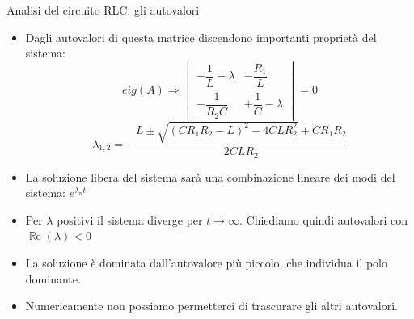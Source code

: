 \documentclass[aspectratio=169, 10pt, handout,usenames,dvipsnames]{beamer}
\begin{document}
\begin{frame}{Analisi del circuito RLC: gli autovalori}
    \begin{itemize}
        \item Dagli autovalori di questa matrice discendono importanti proprietà del sistema:
        \medskip
        \[
        eig(A) \Rightarrow  \begin{vmatrix} -\dfrac{1}{L}-\lambda & - \dfrac{R_1}{L}\\[1.5ex] -\dfrac{1}{R_2 C} & + \dfrac{1}{C}-\lambda \end{vmatrix} = 0
        \]
        \medskip
        \[
        \lambda_{1,2}  = -\frac{L \pm \sqrt{(C R_1 R_2 - L)^2 - 4CL R_2 ^2} + C R_1 R_2} {2 C L R_2}
        \]
        \medskip
        \item La soluzione libera del sistema sarà una combinazione lineare dei \alert{modi} del sistema: \( e^{\lambda_nt}\)
        \item Per $\lambda$ positivi il sistema diverge per $t \rightarrow \infty $. Chiediamo quindi autovalori con $\operatorname{\mathbb{R}e}(\lambda)<0$
        \item La soluzione è dominata dall'autovalore \alert{più piccolo}, che individua il polo dominante. 
        \item Numericamente non possiamo permetterci di trascurare gli altri autovalori.
        
        
 \end{itemize}
\end{frame}
\end{document}
